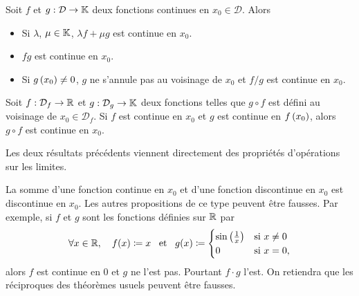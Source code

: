 \documentclass{magnolia}
\begin{document}
\begin{proposition}[utile=-3, nom={Théorèmes usuels}]
Soit $f$ et $g:\mathcal{D}\to\mathbb{K}$ deux fonctions continues en $x_0\in\mathcal{D}$. Alors
\begin{itemize}
\item Si $\lambda$, $\mu\in\mathbb{K}$, $\lambda f+\mu g$ est continue en $x_0$.
\item $fg$ est continue en $x_0$.
\item Si $g\left(x_0\right)\neq 0$, $g$ ne s'annule pas au voisinage de $x_0$ et
  $f/g$ est continue en $x_0$.
\end{itemize}
\end{proposition}


\begin{proposition}[utile=-3,nom={Théorèmes usuels}]
Soit $f:\mathcal{D}_f\to\mathbb{R}$ et $g:\mathcal{D}_g\to\mathbb{K}$ deux fonctions telles que
$g\circ f$ est défini au voisinage de $x_0\in\mathcal{D}_f$. Si $f$ est continue en
$x_0$ et $g$ est continue en $f\left(x_0\right)$, alors $g\circ f$ est continue en $x_0$.
\end{proposition}

\begin{preuve}
Les deux résultats précédents viennent directement des propriétés d'opérations sur les limites.
\end{preuve}

\begin{remarqueUnique}
\remarque La somme d'une fonction continue en $x_0$ et d'une fonction
  discontinue en $x_0$ est discontinue en $x_0$. Les autres propositions de ce
  type peuvent être fausses. Par exemple, si $f$ et $g$ sont les fonctions
  définies sur $\mathbb{R}$ par
  \[\forall x\in\mathbb{R} ,\quad f(x)\coloneqq x \quad\!\text{et}\quad\! g(x)\coloneqq
    \begin{cases}
    \sin\left(\frac{1}{x}\right) & \text{si $x\neq 0$}\\
    0 & \text{si $x=0$,}
    \end{cases}\]
  alors $f$ est continue en 0 et $g$ ne l'est pas. Pourtant $f\cdot g$ l'est.
  On retiendra que les réciproques des théorèmes usuels peuvent être
  fausses.
\end{remarqueUnique}
\end{document}

